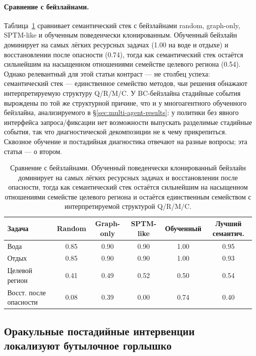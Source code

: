 \documentclass{article}
\begin{document}
\paragraph{Сравнение с бейзлайнами.}
Таблица~\ref{tab:baselines} сравнивает семантический стек с бейзлайнами random,
graph-only, SPTM-like и обученным поведенчески клонированным. Обученный
бейзлайн доминирует на самых лёгких ресурсных задачах (1.00 на воде
и отдыхе) и восстановлении после опасности (0.74), тогда как семантический стек остаётся
сильнейшим на насыщенном отношениями семействе целевого региона (0.54).
Однако релевантный для этой статьи контраст --- не столбец успеха:
семантический стек --- единственное семейство методов, чьи решения обнажают
интерпретируемую структуру Q/R/M/C. У BC-бейзлайна стадийные события
вырождены по той же структурной причине, что и у многоагентного
обученного бейзлайна, анализируемого в \S\ref{sec:multi-agent-results}: у
политики без явного интерфейса запроса/фиксации нет возможности выпускать разделимые
стадийные события, так что диагностической декомпозиции не к чему
прикрепиться. Сквозное обучение и постадийная диагностика отвечают на разные
вопросы; эта статья --- о втором.

\begin{table}[t]
  \caption{Сравнение с бейзлайнами. Обученный поведенчески клонированный бейзлайн доминирует на самых лёгких ресурсных задачах и восстановлении после опасности, тогда как семантический стек остаётся сильнейшим на насыщенном отношениями семействе целевого региона и остаётся единственным семейством с интерпретируемой структурой Q/R/M/C.}
  \label{tab:baselines}
  \centering
  \small
  \begin{tabular}{p{1.9cm}c c c c c}
    \toprule
    Задача & Random & Graph-only & SPTM-like & Обученный & Лучший семантич. \\
    \midrule
    Вода & 0.85 & 0.90 & 0.90 & 1.00 & 0.95 \\
    Отдых & 0.85 & 0.90 & 0.90 & 1.00 & 0.93 \\
    Целевой регион & 0.41 & 0.49 & 0.52 & 0.50 & 0.54 \\
    Восст. после опасности & 0.08 & 0.39 & 0.00 & 0.74 & 0.40 \\
    \bottomrule
  \end{tabular}
\end{table}

\subsection{Оракульные постадийные интервенции локализуют бутылочное горлышко}
\label{sec:oracle}
\end{document}
